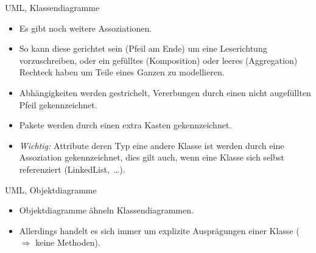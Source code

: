 \begin{frame}{UML, Klassendiagramme}
    \begin{itemize}[<+(1)->]
        \item Es gibt noch weitere Assoziationen.
        \item So kann diese gerichtet sein (Pfeil am Ende) um eine Leserichtung vorzuschreiben,\pause{} oder ein gefülltes (Komposition) oder leeres (Aggregation) Rechteck haben um Teile eines Ganzen zu modellieren.
        \item Abhängigkeiten werden gestrichelt, Vererbungen durch einen nicht augefüllten Pfeil gekennzeichnet.
        \item Pakete werden durch einen extra Kasten gekennzeichnet.
        \item \textit{Wichtig:} Attribute deren Typ eine andere Klasse ist werden durch eine Assoziation gekennzeichnet,\pause{} dies gilt auch, wenn eine Klasse sich selbst referenziert\pause{} (LinkedList,~\ldots).
    \end{itemize}
\end{frame}

\begin{frame}{UML, Objektdiagramme}
    \hypertarget<1>{uml:object}{}\begin{itemize}[<+(1)->]
        \widei
        \item Objektdiagramme ähneln Klassendiagrammen.
        \item Allerdings handelt es sich immer um explizite Ausprägungen einer Klasse\pause{} (\(\Rightarrow\) keine Methoden).
    \end{itemize}
    \vfill\pause{}
    \begin{center}
    \end{center}\vfill\hbox{}
\end{frame}

